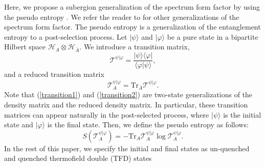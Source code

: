\documentclass[%
twocolumn, 
secnumarabic,amssymb, preprintnumbers, superscriptaddress, aps, prl]{revtex4-1}
\newcommand{\Tr}{\text{Tr}}
\newcommand{\f}{\frac}
\def\f {\frac}
\def\Tr{\mathrm{Tr}}
\begin{document}

Here, we propose a subergion generalization of the spectrum form factor by using the pseudo entropy \cite{Nakata_2021}.  We refer the reader to \cite{Chen:2017yzn, Chen:2018hjf, Ma:2020uox} for other generalizations of the spectrum form factor. The pseudo entropy is a generalization of the entanglement entropy to a post-selection process.  Let $|\psi\rangle$ and $|\varphi\rangle$ be a pure state in a bipartite Hilbert space $\mathcal{H}_A\otimes\mathcal{H}_{\bar{A}}$. We introduce a transition matrix,
\begin{equation}
\mathcal{T}^{\psi|\varphi}=\frac{|\psi\rangle\langle\varphi|}{\langle\varphi|\psi\rangle}, \label{transition1}
\end{equation}
and a reduced transition matrix 
\begin{equation}
\mathcal{T}^{\psi|\varphi}_A=\mathrm{Tr}_{\bar{A}}\mathcal{T}^{\psi|\varphi}. \label{transition2}
\end{equation}
Note that (\ref{transition1}) and (\ref{transition2}) are two-state generalizations of the density matrix and the reduced density matrix. In particular, these transition matrices can  appear naturally in the post-selected process, where $|\psi\rangle$ is the initial state and $|\varphi\rangle$ is the final state. Then, we define the pseudo entropy as follows:
\begin{equation}
    S(\mathcal{T}^{\psi|\varphi}_A)=-\Tr_A{\mathcal{T}^{\psi|\varphi}_A\log\mathcal{T}^{\psi|\varphi}_A}. \label{eq:pre}
\end{equation}
In the rest of this paper, we specify the initial and final states as un-quenched and quenched thermofield double (TFD) states
\end{document}
